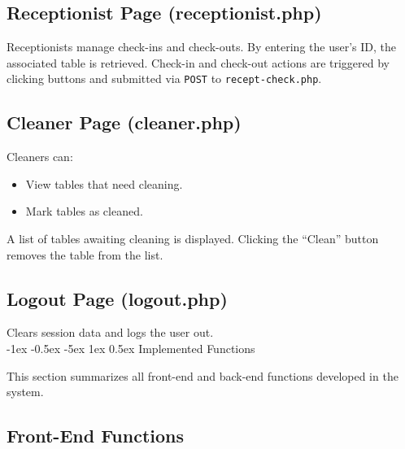 \documentclass[12pt]{article}
\makeatletter
\renewcommand\section{\@startsection{section}{1}{\z@}%
    {-1ex \@plus -0.5ex \@minus -5ex} %
    {1ex \@plus 0.5ex} %
    {\normalfont\Large\bfseries}} %
\makeatother
\begin{document}
\subsection{Receptionist Page (receptionist.php)}
Receptionists manage check-ins and check-outs. By entering the user's ID, the associated table is retrieved.  
Check-in and check-out actions are triggered by clicking buttons and submitted via \texttt{POST} to \texttt{recept-check.php}.

\subsection{Cleaner Page (cleaner.php)}
Cleaners can:
\begin{itemize}
    \item View tables that need cleaning.
    \item Mark tables as cleaned.
\end{itemize}
A list of tables awaiting cleaning is displayed.  
Clicking the ``Clean'' button removes the table from the list.

\subsection{Logout Page (logout.php)}
Clears session data and logs the user out.\\







\section{Implemented Functions}

This section summarizes all front-end and back-end functions developed in the system.

\subsection{Front-End Functions}
\end{document}

